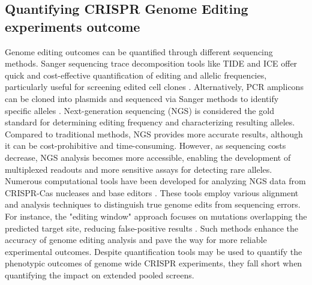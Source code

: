 \documentclass[a4paper, titlepage, openright]{book}
\begin{document}
\subsection{Quantifying CRISPR Genome Editing experiments outcome}
Genome editing outcomes can be quantified through different sequencing methods. Sanger sequencing trace decomposition tools like TIDE and ICE offer quick and cost-effective quantification of editing and allelic frequencies, particularly useful for screening edited cell clones \citep{brinkman2014easy,conant2022inference}. Alternatively, PCR amplicons can be cloned into plasmids and sequenced via Sanger methods to identify specific alleles \citep{canver2014characterization}. Next-generation sequencing (NGS) is considered the gold standard for determining editing frequency and characterizing resulting alleles. Compared to traditional methods, NGS provides more accurate results, although it can be cost-prohibitive and time-consuming. However, as sequencing costs decrease, NGS analysis becomes more accessible, enabling the development of multiplexed readouts and more sensitive assays for detecting rare alleles. Numerous computational tools have been developed for analyzing NGS data from CRISPR-Cas nucleases \citep{park2017cas,pinello2016analyzing} and base editors \citep{clement2019crispresso2,hwang2018web}. These tools employ various alignment and analysis techniques to distinguish true genome edits from sequencing errors. For instance, the "editing window" approach focuses on mutations overlapping the predicted target site, reducing false-positive results \citep{clement2019crispresso2}. Such methods enhance the accuracy of genome editing analysis and pave the way for more reliable experimental outcomes. Despite quantification tools may be used to quantify the phenotypic outcomes of genome wide CRISPR experiments, they fall short when quantifying the impact on extended pooled screens. 

\end{document}
